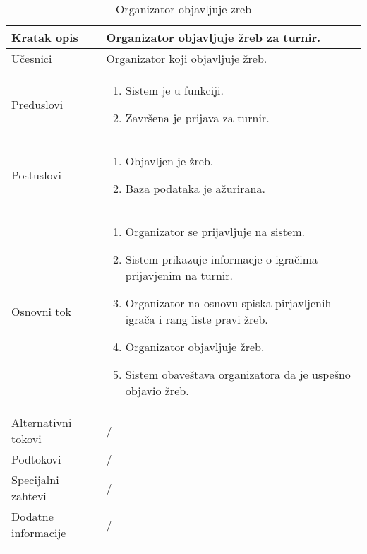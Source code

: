 \documentclass{article}
\begin{document}
\begin{longtable}{| p{} | p{} |} 
\hline
    Kratak opis & Organizator objavljuje žreb za turnir.\\ 
\hline    
    Učesnici & 
         Organizator koji objavljuje žreb.
    \\
\hline
   Preduslovi & \begin{enumerate}
       \item Sistem je u funkciji.
       \item Završena je prijava za turnir.
   \end{enumerate}\\
\hline  
    Postuslovi & \begin{enumerate}
        \item Objavljen je žreb.
        \item Baza podataka je ažurirana.
    \end{enumerate}\\
\hline
    Osnovni tok & \begin{enumerate}
        \item Organizator se prijavljuje na sistem.
        \item Sistem prikazuje informacje o igračima prijavjenim na turnir.
        \item Organizator na osnovu spiska pirjavljenih igrača i rang liste pravi žreb.
        \item Organizator objavljuje žreb.
        \item Sistem obaveštava organizatora da je uspešno objavio žreb.
    \end{enumerate}\\
\hline
    Alternativni tokovi & /\\
\hline
    Podtokovi & /\\
\hline
    Specijalni zahtevi & /\\
\hline
    Dodatne informacije & / \\
\hline
 
\caption{Organizator objavljuje zreb} 
\end{longtable}
\end{document}
